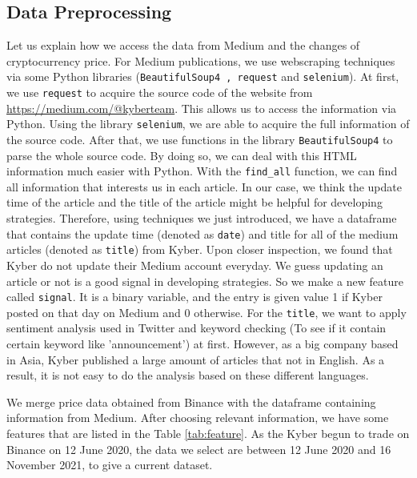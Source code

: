 \documentclass[twoside]{report}
\newcommand{\code}{\texttt}
\begin{document}
\begin{spacing}{1}
\subsection{Data Preprocessing}
Let us explain how we access the data from Medium and the changes of cryptocurrency price. For Medium publications, we use webscraping techniques via some Python libraries (\code{BeautifulSoup4 , request} and \code{selenium}). At first, we use \code{request} to acquire the source code of the website from \url{https://medium.com/@kyberteam}. This allows us to access the information via Python. Using the library \code{selenium}, we are able to acquire the full information of the source code. After that, we use functions in the library \code{BeautifulSoup4} to parse the whole source code. By doing so, we can deal with this HTML information much easier with Python. With the \code{find\_all} function, we can find all information that interests us in each article. In our case, we think the update time of the article and the title of the article might be helpful for developing strategies. Therefore, using techniques we just introduced, we have a dataframe that contains the update time (denoted as \code{date}) and title for all of the medium articles (denoted as \code{title}) from Kyber.
Upon closer inspection, we found that Kyber do not update their Medium account everyday. We guess updating an article or not is a good signal in developing strategies. So we make a new feature called \code{signal}. It is a binary variable, and the entry is given value 1 if Kyber posted on that day on Medium and 0 otherwise.  For the \code{title}, we want to apply sentiment analysis used in Twitter and keyword checking (To see if it contain certain keyword like 'announcement') at first. However, as a big company based in Asia, Kyber published a large amount of articles that not in English. As a result, it is not easy to do the analysis based on these different languages.  

We merge price data obtained from Binance with the dataframe containing information from Medium. After choosing relevant information, we have some features that are listed in the Table \ref{tab:feature}. As the Kyber begun to trade on Binance on 12 June 2020, the data we select are between 12 June 2020 and 16 November 2021, to give a current dataset. 



\end{spacing}
\end{document}
